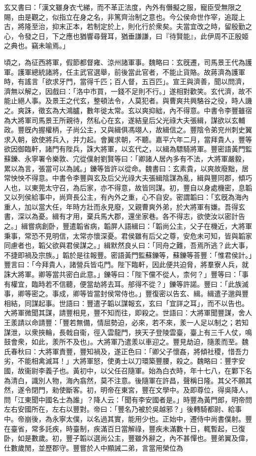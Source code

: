 \begin{pinyinscope}
玄又書曰：「漢文雖身衣弋綈，而不革正法度，內外有僭擬之服，寵臣受無限之賜，由是觀之，似指立在身之名，非篤齊治制之意也。今公侯命世作宰，追蹤上古，將隆至治，抑末正本，若制定於上，則化行於衆矣。夫當宜改之時，留殷勤之心，令發之日，下之應也猶響尋聲耳，猶垂謙謙，曰『待賢能』，此伊周不正殷姬之典也。竊未喻焉。」

頃之，為征西將軍，假節都督雍、涼州諸軍事。魏略曰：玄旣遷，司馬景王代為護軍。護軍總統諸將，任主武官選舉，前後當此官者，不能止貨賂。故蔣濟為護軍時，有謠言「欲求牙門，當得千匹；百人督，五百匹」。宣王與濟善，聞以問濟，濟無以解之，因戲曰：「洛中市買，一錢不足則不行。」遂相對歡笑。玄代濟，故不能止絕人事。及景王之代玄，整頓法令，人莫犯者。與曹爽共興駱谷之役，時人譏之。爽誅，徵玄為大鴻臚，數年徙太常。玄以爽抑絀，內不得意。中書令李豐雖宿為大將軍司馬景王所親待，然私心在玄，遂結皇后父光祿大夫張緝，謀欲以玄輔政。豐旣內握權柄，子尚公主，又與緝俱馮翊人，故緝信之。豐陰令弟兖州刺史翼求入朝，欲使將兵入，并力起。會翼求朝，不聽。嘉平六年二月，當拜貴人，豐等欲因御臨軒，諸門有陛兵，誅大將軍，以玄代之，以緝為驃騎將軍。豐密語黃門監蘇鑠、永寧署令樂敦、宂從僕射劉賢等曰：「卿諸人居內多有不法，大將軍嚴毅，累以為言，張當可以為誡。」鑠等皆許以從命。魏書曰：玄素貴，以爽故廢黜，居常怏怏不得意。中書令李豐與玄及后父光祿大夫張緝陰謀為亂，緝與豐同郡，傾巧人也，以東莞太守召，為后家，亦不得意，故皆同謀。初，豐自以身處機密，息韜又以列侯給事中，尚齊長公主，有內外之重，心不自安。密謂韜曰：「玄旣為海內重人，加以當大任，年時方壯而永見廢，又親曹爽外弟，於大將軍有嫌。吾得玄書，深以為憂。緝有才用，棄兵馬大郡，還坐家巷。各不得志，欲使汝以密計告之。」緝嘗病創卧，豐遣韜省病，韜屏人語緝曰：「韜尚公主，父子在機近，大將軍秉事，常恐不見明信，太常亦懷深憂。君侯雖有后父之尊，安危未可知，皆與韜家同慮者也，韜父欲與君侯謀之。」緝默然良乆曰：「同舟之難，吾焉所逃？此大事，不捷即禍及宗族。」韜於是往報豐。密語黃門監蘇鑠等，蘇鑠等荅豐：「惟君侯計。」豐言曰：「今拜貴人，諸營兵皆屯門。陛下臨軒，因此便共迫脅，將羣寮人兵，就誅大將軍。卿等當共密白此意。」鑠等曰：「陛下儻不從人，柰何？」豐等曰：「事有權宜，臨時若不信聽，便當劫將去耳。郍得不從？」鑠等許諾。豐曰：「此族滅事，卿等密之。事成，卿等皆當封侯常侍也。」豐復密以告玄、緝。緝遣子邈與豐相結，同謀起事。世語曰：豐遣子韜以謀報玄，玄曰「宜詳之耳」，而不以告也。大將軍微聞其謀，請豐相見，豐不知而往，即殺之。世語曰：大將軍聞豐謀，舍人王羕請以命請豐：「豐若無備，情屈勢迫，必來，若不來，羕一人足以制之；若知謀泄，以衆挾輪，長戟自衞，徑入雲龍門，挾天子登陵雲臺，臺上有三千人仗，鳴鼓會衆，如此，羕所不及也」。大將軍乃遣羕以車迎之。豐見劫迫，隨羕而至。魏氏春秋曰：大將軍責豐，豐知禍及，遂正色曰：「卿父子懷姦，將傾社稷，惜吾力劣，不能相禽滅耳！」大將軍怒，使勇士以刀環築豐腰，殺之。魏略曰：豐字安國，故衞尉李義子也。黃初中，以父任召隨軍。始為白衣時，年十七八，在鄴下名為清白，識別人物，海內翕然，莫不注意。後隨軍在許昌，聲稱日隆。其父不願其然，遂令閉門，勑使斷客。初，明帝在東宮，豐在文學中。及即尊位，得吳降人，問「江東聞中國名士為誰」？降人云：「聞有李安國者是。」時豐為黃門郎，明帝問左右安國所在，左右以豐對。帝曰：「豐名乃被於吳越邪？」後轉騎都尉、給事中。帝崩後，為永寧太僕，以名過其實，能用少也。正始中，遷侍中尚書僕射。豐在臺省，常多託疾，時臺制，疾滿百日當解祿，豐疾未滿數十日，輒暫起，已復卧，如是數歲。初，豐子韜以選尚公主，豐雖外辭之，內不甚憚也。豐弟翼及偉，仕數歲閒，並歷郡守。豐嘗於人中顯誡二弟，言當用榮位為
\end{pinyinscope}
